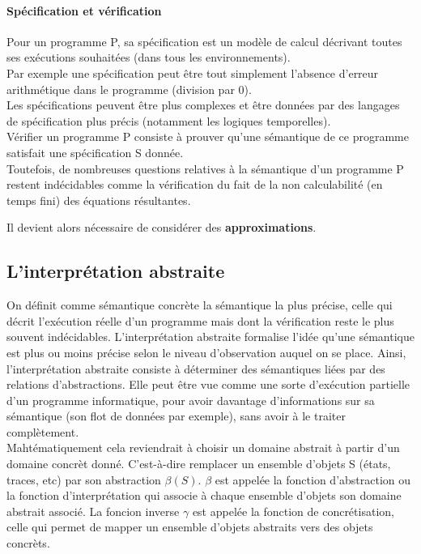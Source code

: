 \documentclass[french]{article}
\begin{document}
\paragraph{Spécification et vérification}
Pour un programme P, sa spécification est un modèle de calcul décrivant toutes ses
exécutions souhaitées (dans tous les environnements).  \\
Par exemple une spécification peut être tout simplement l'absence d'erreur arithmétique
dans le programme (division par 0). \\
Les spécifications peuvent être plus complexes et être données par des langages
de spécification plus précis (notamment les logiques temporelles). \\
Vérifier un programme P consiste à prouver qu’une sémantique de ce programme
satisfait une spécification S donnée. \\

Toutefois, de nombreuses questions relatives à la sémantique d'un programme P restent indécidables
comme la vérification du fait de la non calculabilité (en temps fini) des équations résultantes.

Il devient alors nécessaire de considérer des \textbf{approximations}.

\subsection{L'interprétation abstraite}
On définit comme sémantique concrète la sémantique la plus précise, celle qui décrit l'exécution
réelle d'un programme mais dont la vérification reste le plus souvent indécidables.
L’interprétation abstraite formalise l’idée qu’une sémantique est plus ou moins précise
selon le niveau d’observation auquel on se place. Ainsi, l'interprétation abstraite consiste à
déterminer des sémantiques liées par des relations d'abstractions. Elle peut être vue comme une sorte d'exécution partielle d'un programme informatique, pour avoir davantage d'informations sur sa sémantique (son flot de données par exemple), sans avoir à le traiter complètement. \\

Mahtématiquement cela reviendrait à choisir un domaine abstrait à partir d'un domaine concrèt donné. C'est-à-dire remplacer un ensemble d'objets S (états, traces, etc) par son abstraction $\beta(S)$. $\beta$ est appelée la fonction d'abstraction ou la fonction d'interprétation qui associe à chaque ensemble d'objets son domaine abstrait associé. La foncion inverse $\gamma$ est appelée la fonction de concrétisation, celle qui permet de mapper un ensemble d'objets abstraits vers des objets concrèts.
\end{document}
